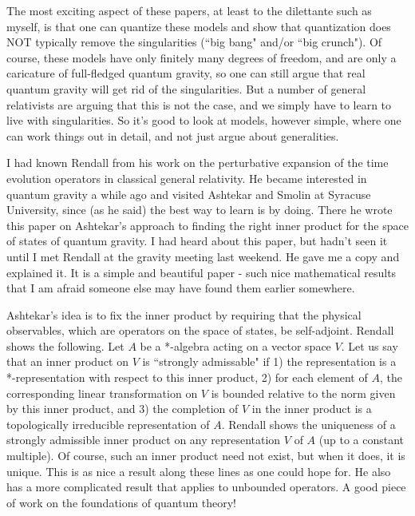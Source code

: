 The most exciting aspect of these papers, at least to the dilettante such as myself, is that one can quantize these models and show that quantization does NOT typically remove the singularities (``big bang" and/or ``big crunch"). Of course, these models have only finitely many degrees of freedom, and are only a caricature of full-fledged quantum gravity, so one can still argue that real quantum gravity will get rid of the singularities. But a number of general relativists are arguing that this is not the case, and we simply have to learn to live with singularities. So it's good to look at models, however simple, where one can work things out in detail, and not just argue about generalities.


I had known Rendall from his work on the perturbative expansion of the time evolution operators in classical general relativity. He became interested in quantum gravity a while ago and visited Ashtekar and Smolin at Syracuse University, since (as he said) the best way to learn is by doing. There he wrote this paper on Ashtekar's approach to finding the right inner product for the space of states of quantum gravity. I had heard about this paper, but hadn't seen it until I met Rendall at the gravity meeting last weekend. He gave me a copy and explained it. It is a simple and beautiful paper - such nice mathematical results that I am afraid someone else may have found them earlier somewhere.

Ashtekar's idea is to fix the inner product by requiring that the physical observables, which are operators on the space of states, be self-adjoint. Rendall shows the following. Let $A$ be a *-algebra acting on a vector space $V$. Let us say that an inner product on $V$ is ``strongly admissable" if 1) the representation is a *-representation with respect to this inner product, 2) for each element of $A$, the corresponding linear transformation on $V$ is bounded relative to the norm given by this inner product, and 3) the completion of $V$ in the inner product is a topologically irreducible representation of $A$. Rendall shows the uniqueness of a strongly admissible inner product on any representation $V$ of $A$ (up to a constant multiple). Of course, such an inner product need not exist, but when it does, it is unique. This is as nice a result along these lines as one could hope for. He also has a more complicated result that applies to unbounded operators. A good piece of work on the foundations of quantum theory!

